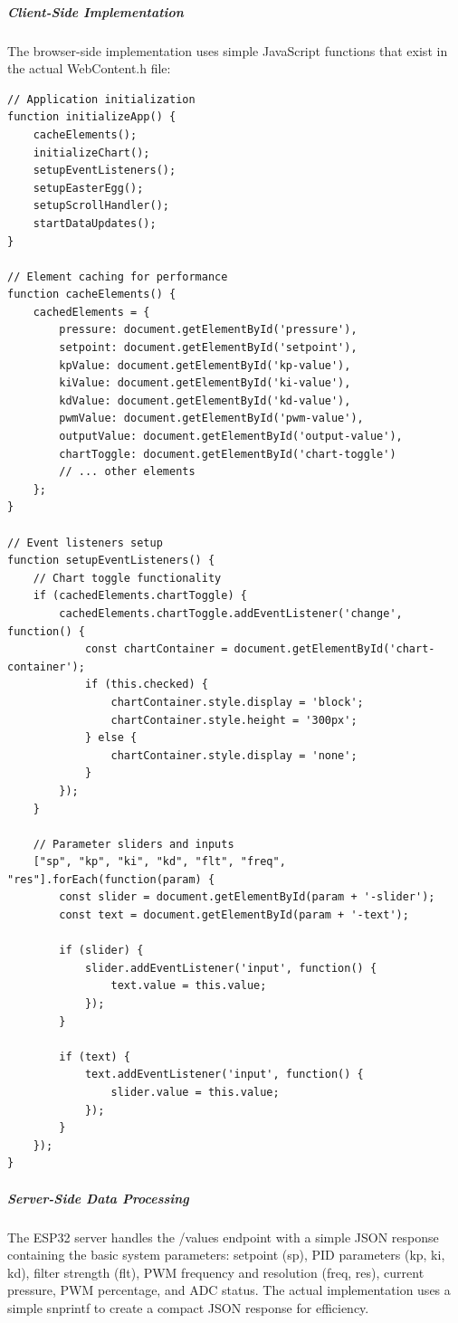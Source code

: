 \documentclass[12pt,a4paper]{article}
\begin{document}
\subparagraph{Client-Side Implementation}
The browser-side implementation uses simple JavaScript functions that exist in the actual WebContent.h file:

\begin{lstlisting}[caption=Actual JavaScript Implementation from WebContent.h]
// Application initialization
function initializeApp() {
    cacheElements();
    initializeChart();
    setupEventListeners();
    setupEasterEgg();
    setupScrollHandler();
    startDataUpdates();
}

// Element caching for performance
function cacheElements() {
    cachedElements = {
        pressure: document.getElementById('pressure'),
        setpoint: document.getElementById('setpoint'),
        kpValue: document.getElementById('kp-value'),
        kiValue: document.getElementById('ki-value'),
        kdValue: document.getElementById('kd-value'),
        pwmValue: document.getElementById('pwm-value'),
        outputValue: document.getElementById('output-value'),
        chartToggle: document.getElementById('chart-toggle')
        // ... other elements
    };
}

// Event listeners setup
function setupEventListeners() {
    // Chart toggle functionality
    if (cachedElements.chartToggle) {
        cachedElements.chartToggle.addEventListener('change', function() {
            const chartContainer = document.getElementById('chart-container');
            if (this.checked) {
                chartContainer.style.display = 'block';
                chartContainer.style.height = '300px';
            } else {
                chartContainer.style.display = 'none';
            }
        });
    }
    
    // Parameter sliders and inputs
    ["sp", "kp", "ki", "kd", "flt", "freq", "res"].forEach(function(param) {
        const slider = document.getElementById(param + '-slider');
        const text = document.getElementById(param + '-text');
        
        if (slider) {
            slider.addEventListener('input', function() {
                text.value = this.value;
            });
        }
        
        if (text) {
            text.addEventListener('input', function() {
                slider.value = this.value;
            });
        }
    });
}
\end{lstlisting}


\subparagraph{Server-Side Data Processing}
The ESP32 server handles the /values endpoint with a simple JSON response containing the basic system parameters: setpoint (sp), PID parameters (kp, ki, kd), filter strength (flt), PWM frequency and resolution (freq, res), current pressure, PWM percentage, and ADC status. The actual implementation uses a simple snprintf to create a compact JSON response for efficiency.
\end{document}
